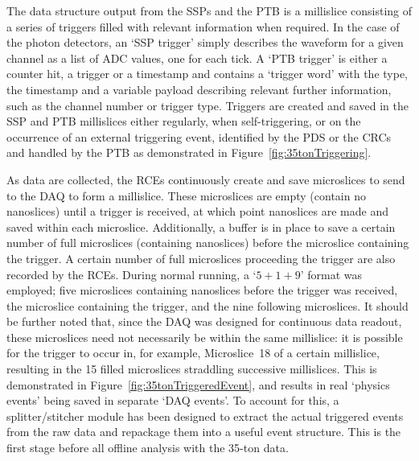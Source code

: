 The data structure output from the SSPs and the PTB is a millislice consisting of a series of triggers filled with relevant information when required.  In the case of the photon detectors, an `SSP trigger' simply describes the waveform for a given channel as a list of ADC values, one for each tick.  A `PTB trigger' is either a counter hit, a trigger or a timestamp and contains a `trigger word' with the type, the timestamp and a variable payload describing relevant further information, such as the channel number or trigger type.  Triggers are created and saved in the SSP and PTB millislices either regularly, when self-triggering, or on the occurrence of an external triggering event, identified by the PDS or the CRCs and handled by the PTB as demonstrated in Figure~\ref{fig:35tonTriggering}.

As data are collected, the RCEs continuously create and save microslices to send to the DAQ to form a millislice.  These microslices are empty (contain no nanoslices) until a trigger is received, at which point nanoslices are made and saved within each microslice.  Additionally, a buffer is in place to save a certain number of full microslices (containing nanoslices) before the microslice containing the trigger.  A certain number of full microslices proceeding the trigger are also recorded by the RCEs.  During normal running, a `$5+1+9$' format was employed; five microslices containing nanoslices before the trigger was received, the microslice containing the trigger, and the nine following microslices.  It should be further noted that, since the DAQ was designed for continuous data readout, these microslices need not necessarily be within the same millislice: it is possible for the trigger to occur in, for example, Microslice~18 of a certain millislice, resulting in the 15 filled microslices straddling successive millislices.  This is demonstrated in Figure~\ref{fig:35tonTriggeredEvent}, and results in real `physics events' being saved in separate `DAQ events'.  To account for this, a splitter/stitcher module has been designed to extract the actual triggered events from the raw data and repackage them into a useful event structure.  This is the first stage before all offline analysis with the 35-ton data.

